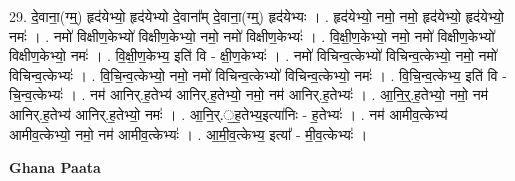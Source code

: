 \documentclass[17pt]{extarticle}
\begin{document}
29. दे॒वाना॒(ग्म्॒) हृद॑येभ्यो॒ हृद॑येभ्यो दे॒वाना᳚म् दे॒वाना॒(ग्म्॒) हृद॑येभ्यः । . हृद॑येभ्यो॒ नमो॒ नमो॒ हृद॑येभ्यो॒ हृद॑येभ्यो॒ नमः॑ । . नमो॑ विक्षीण॒केभ्यो॑ विक्षीण॒केभ्यो॒ नमो॒ नमो॑ विक्षीण॒केभ्यः॑ । . वि॒क्षी॒ण॒केभ्यो॒ नमो॒ नमो॑ विक्षीण॒केभ्यो॑ विक्षीण॒केभ्यो॒ नमः॑ । . वि॒क्षी॒ण॒केभ्य॒ इति॑ वि - क्षी॒ण॒केभ्यः॑ । . नमो॑ विचिन्व॒त्केभ्यो॑ विचिन्व॒त्केभ्यो॒ नमो॒ नमो॑ विचिन्व॒त्केभ्यः॑ । . वि॒चि॒न्व॒त्केभ्यो॒ नमो॒ नमो॑ विचिन्व॒त्केभ्यो॑ विचिन्व॒त्केभ्यो॒ नमः॑ । . वि॒चि॒न्व॒त्केभ्य॒ इति॑ वि - चि॒न्व॒त्केभ्यः॑ । . नम॑ आनिर्.ह॒तेभ्य॑ आनिर्.ह॒तेभ्यो॒ नमो॒ नम॑ आनिर्.ह॒तेभ्यः॑ । . आ॒नि॒र्॒.ह॒तेभ्यो॒ नमो॒ नम॑ आनिर्.ह॒तेभ्य॑ आनिर्.ह॒तेभ्यो॒ नमः॑ । . आ॒नि॒र्.॒ह॒तेभ्य॒इत्या॑निः - ह॒तेभ्यः॑ । . नम॑ आमीव॒त्केभ्य॑ आमीव॒त्केभ्यो॒ नमो॒ नम॑ आमीव॒त्केभ्यः॑ । . आ॒मी॒व॒त्केभ्य॒ इत्या᳚ - मी॒व॒त्केभ्यः॑ । \newline

\textbf{Ghana Paata } \newline
\end{document}
